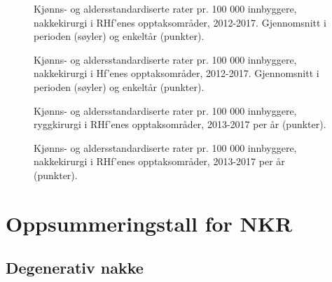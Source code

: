 \documentclass [norsk,a4paper,twoside]{article}\usepackage[]{graphicx}\usepackage[]{color}
\begin{document}
\begin{figure}[ht]
\caption{Kjønns- og aldersstandardiserte rater pr. 100 000 innbyggere, nakkekirurgi i RHf’enes opptaksområder, 2012-2017. Gjennomsnitt i perioden (søyler) og enkeltår (punkter).}
\label{fig:AA_Nakkekirurgi_BoRHF1}
\end{figure}

\begin{figure}[ht]
\caption{Kjønns- og aldersstandardiserte rater pr. 100 000 innbyggere, nakkekirurgi i Hf’enes opptaksområder, 2012-2017. Gjennomsnitt i perioden (søyler) og enkeltår (punkter).}
\label{fig:AA_Nakkekirurgi_BoHF1}
\end{figure}

\begin{figure}[ht]
\caption{Kjønns- og aldersstandardiserte rater pr. 100 000 innbyggere, ryggkirurgi i RHf’enes opptaksområder, 2013-2017 per år (punkter).}
\label{fig:Rygkirurgi_line1}
\end{figure}

\begin{figure}[ht]
\caption{Kjønns- og aldersstandardiserte rater pr. 100 000 innbyggere, nakkekirurgi i RHf’enes opptaksområder, 2013-2017 per år (punkter).}
\label{fig:Nakkekirurgi_line1}
\end{figure}




\clearpage



\section{Oppsummeringstall for NKR}




\subsection{Degenerativ nakke}
\end{document}
